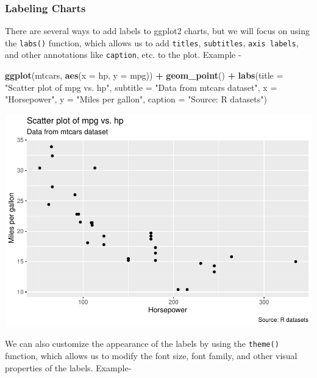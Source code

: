 \documentclass[
]{book}
\newenvironment{Shaded}{\begin{snugshade}}{\end{snugshade}}
\newcommand{\AttributeTok}[1]{\textcolor[rgb]{0.13,0.29,0.53}{#1}}
\newcommand{\FunctionTok}[1]{\textcolor[rgb]{0.13,0.29,0.53}{\textbf{#1}}}
\newcommand{\NormalTok}[1]{#1}
\newcommand{\SpecialCharTok}[1]{\textcolor[rgb]{0.81,0.36,0.00}{\textbf{#1}}}
\newcommand{\StringTok}[1]{\textcolor[rgb]{0.31,0.60,0.02}{#1}}
\begin{document}
\hypertarget{labeling-charts}{%
\subsubsection{Labeling Charts}\label{labeling-charts}}

There are several ways to add labels to ggplot2 charts, but we will focus on using the \texttt{labs()} function, which allows us to add \texttt{titles}, \texttt{subtitles}, \texttt{axis\ labels}, and other annotations like \texttt{caption}, etc. to the plot. Example -

\begin{Shaded}
\begin{Highlighting}[]
\FunctionTok{ggplot}\NormalTok{(mtcars, }\FunctionTok{aes}\NormalTok{(}\AttributeTok{x =}\NormalTok{ hp, }\AttributeTok{y =}\NormalTok{ mpg)) }\SpecialCharTok{+}
  \FunctionTok{geom\_point}\NormalTok{() }\SpecialCharTok{+}
  \FunctionTok{labs}\NormalTok{(}\AttributeTok{title =} \StringTok{"Scatter plot of mpg vs. hp"}\NormalTok{,}
       \AttributeTok{subtitle =} \StringTok{"Data from mtcars dataset"}\NormalTok{,}
       \AttributeTok{x =} \StringTok{"Horsepower"}\NormalTok{,}
       \AttributeTok{y =} \StringTok{"Miles per gallon"}\NormalTok{,}
       \AttributeTok{caption =} \StringTok{"Source: R datasets"}\NormalTok{)}
\end{Highlighting}
\end{Shaded}

\includegraphics{DauR_files/figure-latex/unnamed-chunk-214-1.pdf}

We can also customize the appearance of the labels by using the \texttt{theme()} function, which allows us to modify the font size, font family, and other visual properties of the labels. Example-
\end{document}

